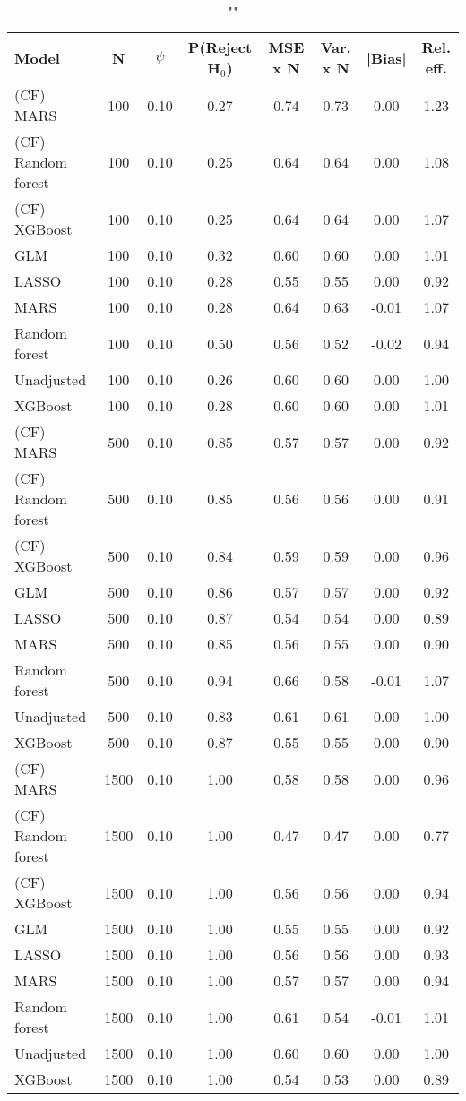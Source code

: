 \begin{table}
\centering
\caption{""}
\begin{tabular}{lccccccc}
\toprule
Model & N & $\psi$ & P(Reject H$_0$) & MSE x N & Var. x N & |Bias| & Rel. eff.\\ \midrule
(CF) MARS & 100 & 0.10 & 0.27 & 0.74 & 0.73 &  0.00 & 1.23 \\ 
(CF) Random forest & 100 & 0.10 & 0.25 & 0.64 & 0.64 &  0.00 & 1.08 \\ 
(CF) XGBoost & 100 & 0.10 & 0.25 & 0.64 & 0.64 &  0.00 & 1.07 \\ 
GLM & 100 & 0.10 & 0.32 & 0.60 & 0.60 &  0.00 & 1.01 \\ 
LASSO & 100 & 0.10 & 0.28 & 0.55 & 0.55 &  0.00 & 0.92 \\ 
MARS & 100 & 0.10 & 0.28 & 0.64 & 0.63 & -0.01 & 1.07 \\ 
Random forest & 100 & 0.10 & 0.50 & 0.56 & 0.52 & -0.02 & 0.94 \\ 
Unadjusted & 100 & 0.10 & 0.26 & 0.60 & 0.60 &  0.00 & 1.00 \\ 
XGBoost & 100 & 0.10 & 0.28 & 0.60 & 0.60 &  0.00 & 1.01 \\ \addlinespace 
(CF) MARS & 500 & 0.10 & 0.85 & 0.57 & 0.57 &  0.00 & 0.92 \\ 
(CF) Random forest & 500 & 0.10 & 0.85 & 0.56 & 0.56 &  0.00 & 0.91 \\ 
(CF) XGBoost & 500 & 0.10 & 0.84 & 0.59 & 0.59 &  0.00 & 0.96 \\ 
GLM & 500 & 0.10 & 0.86 & 0.57 & 0.57 &  0.00 & 0.92 \\ 
LASSO & 500 & 0.10 & 0.87 & 0.54 & 0.54 &  0.00 & 0.89 \\ 
MARS & 500 & 0.10 & 0.85 & 0.56 & 0.55 &  0.00 & 0.90 \\ 
Random forest & 500 & 0.10 & 0.94 & 0.66 & 0.58 & -0.01 & 1.07 \\ 
Unadjusted & 500 & 0.10 & 0.83 & 0.61 & 0.61 &  0.00 & 1.00 \\ 
XGBoost & 500 & 0.10 & 0.87 & 0.55 & 0.55 &  0.00 & 0.90 \\ \addlinespace 
(CF) MARS & 1500 & 0.10 & 1.00 & 0.58 & 0.58 &  0.00 & 0.96 \\ 
(CF) Random forest & 1500 & 0.10 & 1.00 & 0.47 & 0.47 &  0.00 & 0.77 \\ 
(CF) XGBoost & 1500 & 0.10 & 1.00 & 0.56 & 0.56 &  0.00 & 0.94 \\ 
GLM & 1500 & 0.10 & 1.00 & 0.55 & 0.55 &  0.00 & 0.92 \\ 
LASSO & 1500 & 0.10 & 1.00 & 0.56 & 0.56 &  0.00 & 0.93 \\ 
MARS & 1500 & 0.10 & 1.00 & 0.57 & 0.57 &  0.00 & 0.94 \\ 
Random forest & 1500 & 0.10 & 1.00 & 0.61 & 0.54 & -0.01 & 1.01 \\ 
Unadjusted & 1500 & 0.10 & 1.00 & 0.60 & 0.60 &  0.00 & 1.00 \\ 
XGBoost & 1500 & 0.10 & 1.00 & 0.54 & 0.53 &  0.00 & 0.89 \\
\bottomrule
\end{tabular}
\end{table}

